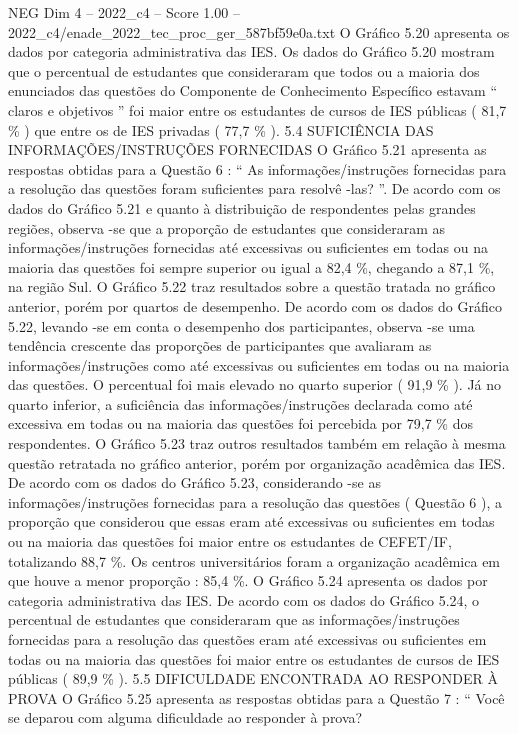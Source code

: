 \begin{textsample}{NEG Dim 4 – 2022\_c4 – Score 1.00 – 2022\_c4/enade\_2022\_tec\_proc\_ger\_587bf59e0a.txt}
O Gráfico 5.20 apresenta os dados por categoria administrativa das IES.
Os dados do Gráfico 5.20 mostram que o percentual de estudantes que consideraram que todos ou a maioria dos enunciados das questões do Componente de Conhecimento Específico estavam “ claros e objetivos ” foi maior entre os estudantes de cursos de IES públicas ( 81,7 \% ) que entre os de IES privadas ( 77,7 \% ). 5.4 SUFICIÊNCIA DAS INFORMAÇÕES/INSTRUÇÕES FORNECIDAS O Gráfico 5.21 apresenta as respostas obtidas para a Questão 6 : “ As informações/instruções fornecidas para a resolução das questões foram suficientes para resolvê -las? ”.
De acordo com os dados do Gráfico 5.21 e quanto à distribuição de respondentes pelas grandes regiões, observa -se que a proporção de estudantes que consideraram as informações/instruções fornecidas até excessivas ou suficientes em todas ou na maioria das questões foi sempre superior ou igual a 82,4 \%, chegando a 87,1 \%, na região Sul.
O Gráfico 5.22 traz resultados sobre a questão tratada no gráfico anterior, porém por quartos de desempenho.
De acordo com os dados do Gráfico 5.22, levando -se em conta o desempenho dos participantes, observa -se uma tendência crescente das proporções de participantes que avaliaram as informações/instruções como até excessivas ou suficientes em todas ou na maioria das questões.
O percentual foi mais elevado no quarto superior ( 91,9 \% ).
Já no quarto inferior, a suficiência das informações/instruções declarada como até excessiva em todas ou na maioria das questões foi percebida por 79,7 \% dos respondentes.
O Gráfico 5.23 traz outros resultados também em relação à mesma questão retratada no gráfico anterior, porém por organização acadêmica das IES.
De acordo com os dados do Gráfico 5.23, considerando -se as informações/instruções fornecidas para a resolução das questões ( Questão 6 ), a proporção que considerou que essas eram até excessivas ou suficientes em todas ou na maioria das questões foi maior entre os estudantes de CEFET/IF, totalizando 88,7 \%.
Os centros universitários foram a organização acadêmica em que houve a menor proporção : 85,4 \%.
O Gráfico 5.24 apresenta os dados por categoria administrativa das IES.
De acordo com os dados do Gráfico 5.24, o percentual de estudantes que consideraram que as informações/instruções fornecidas para a resolução das questões eram até excessivas ou suficientes em todas ou na maioria das questões foi maior entre os estudantes de cursos de IES públicas ( 89,9 \% ). 5.5 DIFICULDADE ENCONTRADA AO RESPONDER À PROVA O Gráfico 5.25 apresenta as respostas obtidas para a Questão 7 : “ Você se deparou com alguma dificuldade ao responder à prova?

\end{textsample}
